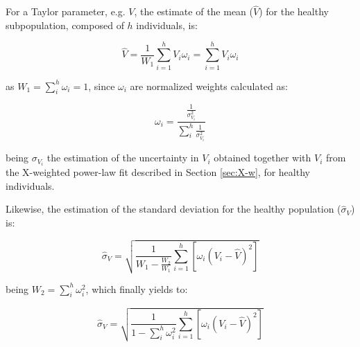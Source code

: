 For a Taylor parameter, e.g. $V$, the estimate of the mean ($\widehat{V}$) for the healthy subpopulation, composed of $h$ individuals, is:
\begin{linenomath}
$$\widehat{V} = \frac{1}{W_1}\sum_{i=1}^h V_i \omega_i=\sum_{i=1}^h V_i \omega_i$$
\end{linenomath}
as $W_1=\sum_i^h \omega_i=1$, since $\omega_i$ are normalized weights calculated as:
\begin{linenomath}
$$\omega_i = \frac{\frac{1}{\sigma^2_{V_i}}}{\sum_i^h\frac{1}{\sigma^2_{V_i}}}$$
\end{linenomath}
being $\sigma_{V_i}$ the estimation of the uncertainty in $V_i$ obtained together with $V_i$ from the X-weighted power-law fit described in Section \ref{sec:X-w}, for healthy individuals.

Likewise, the estimation of the standard deviation for the healthy population ($\widehat{\sigma}_V$) is:
\begin{linenomath}
$$\widehat{\sigma}_V = \sqrt{\frac{1}{W_1-\frac{W_2}{W_1}}\sum_{i=1}^h\left[\omega_i\left(V_i-\hat{V}\right)^2\right]}$$
\end{linenomath}
being $W_2=\sum_i^h \omega_i^2$, which finally yields to:
\begin{linenomath}
$$\widehat{\sigma}_V = \sqrt{\frac{1}{1-\sum_i^h \omega_i^2}\sum_{i=1}^h\left[\omega_i\left(V_i-\hat{V}\right)^2\right]}$$
\end{linenomath}

